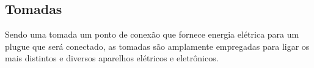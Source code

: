 \subsection{Tomadas} \label{section: socket}

Sendo uma tomada um ponto de conexão que fornece energia elétrica para um plugue que será conectado, as tomadas são amplamente empregadas para ligar os mais distintos e diversos aparelhos elétricos e eletrônicos.




